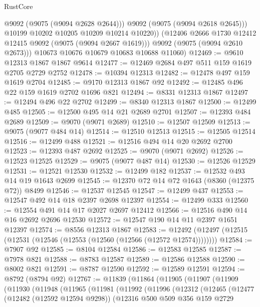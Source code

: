 \begin{lexlean}{RustCore}
\begin{coremodule}
                @9092
                (@9075 (@9094 @2628 @2644)))
              @9092
              (@9075 (@9094 @2618 @2645)))
            @10199
            @10202
            @10205
            @10209
            @10214
            @10220))
        (@12406 @2666 @1730 @12412 @12415 @9092 (@9075 (@9094 @2667 @1619)))
        @9092
        (@9075 (@9094 @2610 @2673)))
      @10673
      @10676
      @10679
      @10683
      @10688
      @11060)
@12469 := @9610 @12313 @1867 @1867 @9614
@12477 := @12469 @2684 @497 @511 @159 @1619 @2705 @2729 @2752
@12478 := @10394 @12313
@12482 := @12478 @497 @159 @1619 @2704
@12485 := @9170 @12313 @1867 @92
@12492 := @12485 @496 @22 @159 @1619 @2702 @1696 @821
@12494 := @8331 @12313 @1867
@12497 := @12494 @496 @22 @2702
@12499 := @8340 @12313 @1867
@12500 := @12499 @485
@12505 := @12500 @495 @14 @21 @2689 @2701
@12507 := @12393 @484 @2689
@12509 := @9070 (@9071 @2689)
@12510 := @12507 @12509
@12513 := @9075 (@9077 @484 @14)
@12514 := @12510 @12513
@12515 := @12505 @12514
@12516 := @12499 @488
@12521 := @12516 @494 @14 @20 @2692 @2700
@12523 := @12393 @487 @2692
@12525 := @9070 (@9071 @2692)
@12526 := @12523 @12525
@12529 := @9075 (@9077 @487 @14)
@12530 := @12526 @12529
@12531 := @12521 @12530
@12532 := @12499 @182
@12537 := @12532 @493 @14 @19 @1643 @2699
@12545 := @12370 @72 @14 @72 @1643 (@8360 (@12375 @72)) @8499
@12546 := @12537 @12545
@12547 := @12499 @437
@12553 := @12547 @492 @14 @18 @2397 @2698 @12397
@12554 := @12499 @333
@12560 := @12554 @491 @14 @17 @2027 @2697 @12412
@12566 := @12516 @490 @14 @16 @2692 @2696 @12530
@12572 := @12547 @190 @14 @11 @2397 @1651 @12397
@12574 := @8556 @12313 @1867
@12583 := @12492 (@12497 (@12515 (@12531 (@12546 (@12553 (@12560 (@12566 (@12572 @12574))))))))
@12584 := @7907 @92
@12585 := @8104 @12584
@12586 := @12583 @12585
@12587 := @7978 @821
@12588 := @8783 @12587
@12589 := @12586 @12588
@12590 := @8002 @821
@12591 := @8787 @12590
@12592 := @12589 @12591
@12594 := @8792 (@8794 @92)
@12767 := @11839
    (@11864
      (@11905
        (@11907
          (@11909
            (@11930
              (@11948
                (@11965
                  (@11981
                    (@11992
                      (@11996
                        (@12312
                          (@12465
                            (@12477
                              (@12482 (@12592 @12594 @9298))
                              (@12316
                                @500
                                @509
                                @356
                                @159
                                @2729

\end{coremodule}
\end{lexlean}
